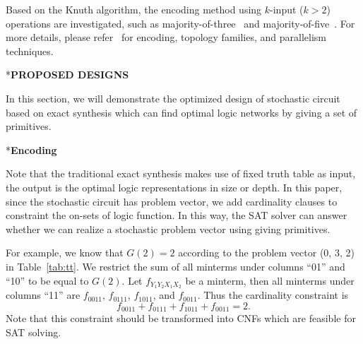 \documentclass[conference,letterpaper]{IEEEtran}
\makeatletter
\renewcommand{\section}{\@startsection{section}{1}{0mm}
    {-\baselineskip}{0.001\baselineskip}{\bf\leftline}}
\renewcommand{\subsection}{\@startsection{subsection}{1}{0mm}
	{-\baselineskip}{0.001\baselineskip}{\bf\leftline}}
\makeatother
\begin{document}
Based on the Knuth algorithm, the encoding method using $k$-input ($k > 2$) operations are investigated, such as majority-of-three~\cite{Majority-of-Three} and majority-of-five~\cite{Majority-of-Five}. For more details, please refer~\cite{SAT-Based-Exact} 
 for encoding, topology families, and parallelism techniques.

\section*{\textbf{\large PROPOSED DESIGNS}}

In this section, we will demonstrate the optimized design of stochastic circuit based on exact synthesis which can find optimal logic networks by giving a set of primitives.
\subsection*{\textbf{Encoding }}




Note that the traditional exact synthesis makes use of fixed truth table as input, the output is the optimal logic representations in size or depth.
In this paper, since the stochastic circuit has problem vector, we add cardinality clauses to constraint the on-sets of logic function. In this way, the SAT solver can answer whether we can realize a stochastic problem vector using giving primitives. 

For example, we know that $G(2) = 2$ according to the problem vector (0, 3, 2) in Table~\ref{tab:tt}. We restrict the sum of all minterms under columns ``01'' and ``10'' to be equal to $G(2)$. 
Let $f_{Y_1Y_2X_1X_2}$ be a minterm, then all minterms under columns ``11''
are $f_{0011}$, $f_{0111}$, $f_{1011}$, and $f_{0011}$.
Thus the cardinality constraint is \vspace{-0.5ex}
\begin{equation}
f_{0011} + f_{0111} + f_{1011} + f_{0011} = 2.
\end{equation}
Note that this constraint should be transformed into CNFs which are feasible for SAT solving.
\end{document}
